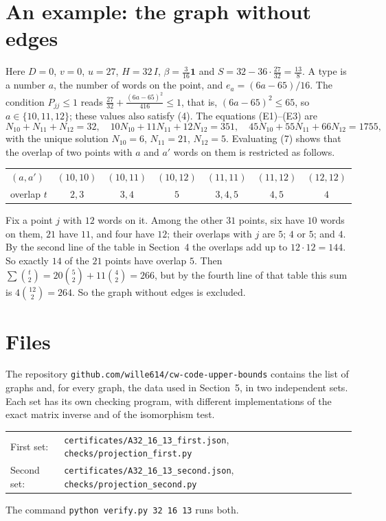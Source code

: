 \documentclass[11pt,a4paper]{article}
\newcommand{\one}{\mathbf{1}}
\begin{document}
\section{An example: the graph without edges}

Here $D=0$, $v=0$, $u=27$, $H=32\,I$, $\beta=\frac3{16}\one$ and
$S=32-36\cdot\frac{27}{32}=\frac{13}8$. A type is a number $a$, the number
of words on the point, and $e_a=(6a-65)/16$. The condition $P_{jj}\le1$
reads $\frac{27}{32}+\frac{(6a-65)^2}{416}\le 1$, that is,
$(6a-65)^2\le 65$, so $a\in\{10,11,12\}$; these values also satisfy (4).
The equations (E1)--(E3) are
\[
N_{10}+N_{11}+N_{12}=32,\quad 10N_{10}+11N_{11}+12N_{12}=351,\quad
45N_{10}+55N_{11}+66N_{12}=1755,
\]
with the unique solution $N_{10}=6$, $N_{11}=21$, $N_{12}=5$. Evaluating (7)
shows that the overlap of two points with $a$ and $a'$ words on them is
restricted as follows.
\begin{center}
\begin{tabular}{lcccccc}
\hline
$(a,a')$ & $(10,10)$ & $(10,11)$ & $(10,12)$ & $(11,11)$ & $(11,12)$ & $(12,12)$\\
overlap $t$ & $2,3$ & $3,4$ & $5$ & $3,4,5$ & $4,5$ & $4$ \\
\hline
\end{tabular}
\end{center}
Fix a point $j$ with $12$ words on it. Among the other $31$ points, six have
$10$ words on them, $21$ have $11$, and four have $12$; their overlaps with
$j$ are $5$; $4$ or $5$; and $4$. By the second line of the table in
Section~4 the overlaps add up to $12\cdot12=144$. So exactly $14$ of the
$21$ points have overlap $5$. Then
$\sum\binom t2=20\binom52+11\binom42=266$, but by the fourth line of that
table this sum is $4\binom{12}2=264$. So the graph without edges is
excluded.

\section{Files}

The repository \texttt{github.com/wille614/cw-code-upper-bounds} contains
the list of graphs and, for every graph, the data used in Section~5, in two
independent sets. Each set has its own checking program, with different
implementations of the exact matrix inverse and of the isomorphism test.
\begin{center}
\begin{tabular}{ll}
First set: & \texttt{certificates/A32\_16\_13\_first.json},\quad
 \texttt{checks/projection\_first.py}\\
Second set: & \texttt{certificates/A32\_16\_13\_second.json},\quad
 \texttt{checks/projection\_second.py}
\end{tabular}
\end{center}
The command \texttt{python verify.py 32 16 13} runs both.
\end{document}
